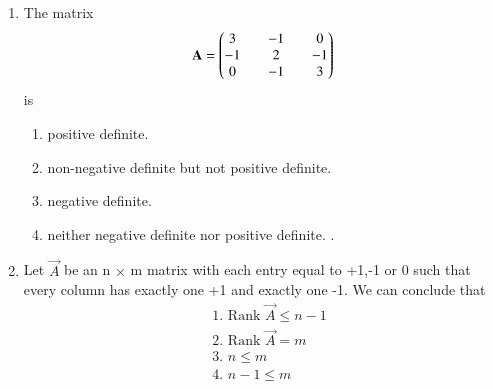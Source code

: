 \renewcommand{\theequation}{\theenumi}
\renewcommand{\thefigure}{\theenumi}
\renewcommand{\thetable}{\theenumi}
\begin{enumerate}[label=\thesection.\arabic*.,ref=\thesection.\theenumi]

\item The matrix
\begin{align}
\mathbf{A} = \begin{pmatrix}3 && -1 && 0 \\ -1 && 2 && -1\\ 0 && -1 && 3\end{pmatrix}
\end{align}
is
\begin{enumerate}
\item positive definite.
\item non-negative definite but not positive definite.
\item negative definite. 
\item neither negative definite nor positive definite. .
\end{enumerate}
%
\solution

\item Let $\vec{A}$ be an n $\times$ m matrix with each entry equal to +1,-1 or 0 such that every column has exactly one +1 and exactly one -1. We can conclude that\\
\begin{align}
    &\mbox{1. Rank } \vec{A}\leq n-1\\
    &\mbox{2. Rank } \vec{A}=m\\    
    &\mbox{3. }n\leq m\\
    &\mbox{4. }n-1\leq m
\end{align}
%
%
\solution



\end{enumerate}

